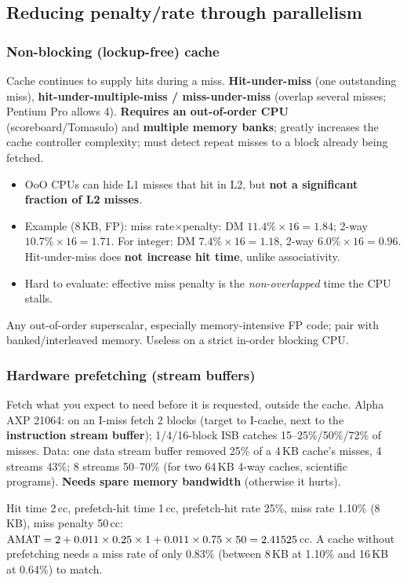 \subsection{Reducing penalty/rate through parallelism}
\subsubsection{Non-blocking (lockup-free) cache}
Cache continues to supply hits during a miss. \textbf{Hit-under-miss} (one outstanding miss), \textbf{hit-under-multiple-miss / miss-under-miss} (overlap several misses; Pentium Pro allows 4). \textbf{Requires an out-of-order CPU} (scoreboard/Tomasulo) and \textbf{multiple memory banks}; greatly increases the cache controller complexity; must detect repeat misses to a block already being fetched.
\begin{itemize}
\item OoO CPUs can hide L1 misses that hit in L2, but \textbf{not a significant fraction of L2 misses}.
\item Example (8\,KB, FP): miss rate$\times$penalty: DM $11.4\%\times16=1.84$; 2-way $10.7\%\times16=1.71$. For integer: DM $7.4\%\times16=1.18$, 2-way $6.0\%\times16=0.96$. Hit-under-miss does \textbf{not increase hit time}, unlike associativity.
\item Hard to evaluate: effective miss penalty is the \emph{non-overlapped} time the CPU stalls.
\end{itemize}
\begin{pick}
Any out-of-order superscalar, especially memory-intensive FP code; pair with banked/interleaved memory. Useless on a strict in-order blocking CPU.
\end{pick}

\subsubsection{Hardware prefetching (stream buffers)}
Fetch what you expect to need before it is requested, outside the cache. Alpha AXP 21064: on an I-miss fetch 2 blocks (target to I-cache, next to the \textbf{instruction stream buffer}); 1/4/16-block ISB catches 15--25\%/50\%/72\% of misses. Data: one data stream buffer removed 25\% of a 4\,KB cache's misses, 4 streams 43\%; 8 streams 50--70\% (for two 64\,KB 4-way caches, scientific programs). \textbf{Needs spare memory bandwidth} (otherwise it hurts).
\begin{ex}[Slide]
Hit time 2\,cc, prefetch-hit time 1\,cc, prefetch-hit rate 25\%, miss rate 1.10\% (8\,KB), miss penalty 50\,cc:\\
$\mathrm{AMAT}=2+0.011\times0.25\times1+0.011\times0.75\times50=2.41525$\,cc. A cache without prefetching needs a miss rate of only 0.83\% (between 8\,KB at 1.10\% and 16\,KB at 0.64\%) to match.
\end{ex}

